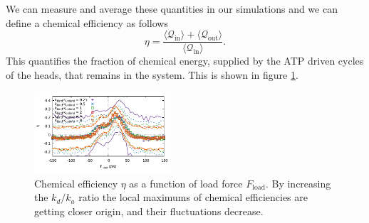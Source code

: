 \documentclass[aps,pre,twocolumn,showpacs,showkeys]{revtex4-1}
\begin{document}
 We can measure and average these quantities in our simulations and we can define a chemical efficiency as follows
\begin{equation}
\eta = \frac{\langle\mathcal Q_\text{in}\rangle+\langle\mathcal Q_\text{out}\rangle}{\langle\mathcal Q_\text{in}\rangle} .
\label{eq:efficiency}
\end{equation}
This quantifies the fraction of chemical energy, supplied by the ATP driven cycles of the heads, that remains in the system. 
This is shown in figure \ref{Fig: chem}.
\begin{figure}[b]
\centering
\includegraphics[width=0.45\textwidth,height=!]{chemical_cycle}
\caption{Chemical efficiency $\eta$ as a function of load force $F_\text{load}$.
By increasing the $k_d/k_a$ ratio the local maximums of chemical efficiencies are getting closer origin,
and their fluctuations decrease. 
}
\label{Fig: chem}
\end{figure}
\end{document}
